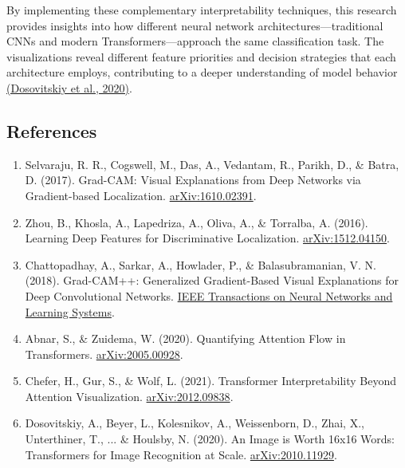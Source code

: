 \documentclass[a4paper,12pt]{article}
\begin{document}
By implementing these complementary interpretability techniques, this research provides insights into how different neural network architectures—traditional CNNs and modern Transformers—approach the same classification task. The visualizations reveal different feature priorities and decision strategies that each architecture employs, contributing to a deeper understanding of model behavior \href{https://arxiv.org/abs/2010.11929}{(Dosovitskiy et al., 2020)}.

\subsection{References}

\begin{enumerate}
    \item Selvaraju, R. R., Cogswell, M., Das, A., Vedantam, R., Parikh, D., \& Batra, D. (2017). Grad-CAM: Visual Explanations from Deep Networks via Gradient-based Localization. \href{https://arxiv.org/abs/1610.02391}{arXiv:1610.02391}.
    
    \item Zhou, B., Khosla, A., Lapedriza, A., Oliva, A., \& Torralba, A. (2016). Learning Deep Features for Discriminative Localization. \href{https://arxiv.org/abs/1512.04150}{arXiv:1512.04150}.
    
    \item Chattopadhay, A., Sarkar, A., Howlader, P., \& Balasubramanian, V. N. (2018). Grad-CAM++: Generalized Gradient-Based Visual Explanations for Deep Convolutional Networks. \href{https://www.sciencedirect.com/science/article/pii/S0893608018302107}{IEEE Transactions on Neural Networks and Learning Systems}.
    
    \item Abnar, S., \& Zuidema, W. (2020). Quantifying Attention Flow in Transformers. \href{https://arxiv.org/abs/2005.00928}{arXiv:2005.00928}.
    
    \item Chefer, H., Gur, S., \& Wolf, L. (2021). Transformer Interpretability Beyond Attention Visualization. \href{https://arxiv.org/abs/2012.09838}{arXiv:2012.09838}.
    
    \item Dosovitskiy, A., Beyer, L., Kolesnikov, A., Weissenborn, D., Zhai, X., Unterthiner, T., ... \& Houlsby, N. (2020). An Image is Worth 16x16 Words: Transformers for Image Recognition at Scale. \href{https://arxiv.org/abs/2010.11929}{arXiv:2010.11929}.
    

\end{enumerate}
\end{document}
